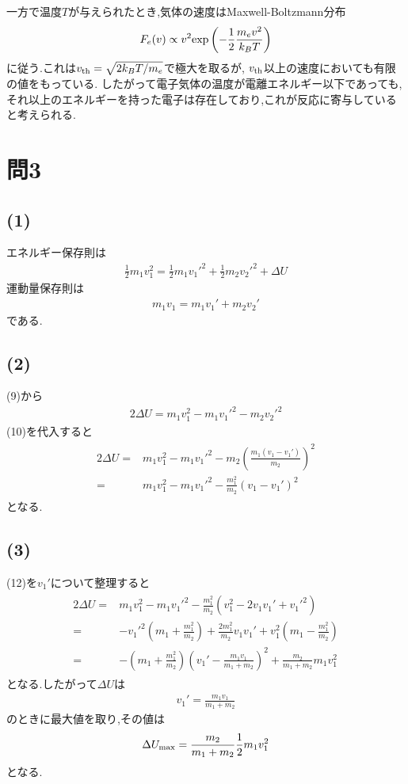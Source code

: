 \documentclass[uplatex,a4j,11pt,dvipdfmx]{jsarticle}
\begin{document}
一方で温度$T$が与えられたとき,気体の速度はMaxwell-Boltzmann分布
\begin{align}
  F_e(v)\propto v^2{\rm exp}\left(-\frac{1}{2}\frac{m_ev^2}{k_BT}\right)
\end{align}
に従う.これは$v_{\rm th}=\sqrt{2k_BT/m_e}$で極大を取るが,
$v_{\rm th}$以上の速度においても有限の値をもっている.
したがって電子気体の温度が電離エネルギー以下であっても,
それ以上のエネルギーを持った電子は存在しており,これが反応に寄与していると考えられる.
\section*{問3}
\subsection*{(1)}
エネルギー保存則は
\begin{align}
  \frac{1}{2}m_1v_1^2=\frac{1}{2}m_1v_1'^2+\frac{1}{2}m_2v_2'^2+\Delta U
\end{align}
運動量保存則は
\begin{align}
  m_1v_1=m_1v_1'+m_2v_2'
\end{align}
である.
\subsection*{(2)}
(9)から
\begin{align}
  2\Delta U=m_1v_1^2-m_1v_1'^2-m_2v_2'^2
\end{align}
(10)を代入すると
\begin{align}
  \begin{split}
    2\Delta U=&m_1v_1^2-m_1v_1'^2-m_2\left(\frac{m_1(v_1-v_1')}{m_2}\right)^2\\
    =&m_1v_1^2-m_1v_1'^2-\frac{m_1^2}{m_2}\left(v_1-v_1'\right)^2
  \end{split}
\end{align}
となる.
\subsection*{(3)}
(12)を$v_1'$について整理すると
\begin{align}
  \begin{split}
    2\Delta U=&m_1v_1^2-m_1v_1'^2-\frac{m_1^2}{m_2}\left(v_1^2-2v_1v_1'+v_1'^2\right)\\
    =&-v_1'^2\left(m_1+\frac{m_1^2}{m_2}\right)+\frac{2m_1^2}{m_2}v_1v_1'+v_1^2\left(m_1-\frac{m_1^2}{m_2}\right)\\
    =&-\left(m_1+\frac{m_1^2}{m_2}\right)\left(v_1'-\frac{m_1v_1}{m_1+m_2}\right)^2
    +\frac{m_2}{m_1+m_2}m_1v_1^2
  \end{split}
\end{align}
となる.したがって$\Delta U$は
\begin{align}
  v_1'=\frac{m_1v_1}{m_1+m_2}
\end{align}
のときに最大値を取り,その値は
\begin{align}
  \Delta U_{\rm max}=\frac{m_2}{m_1+m_2}\frac{1}{2}m_1v_1^2
\end{align}
となる.
\end{document}
